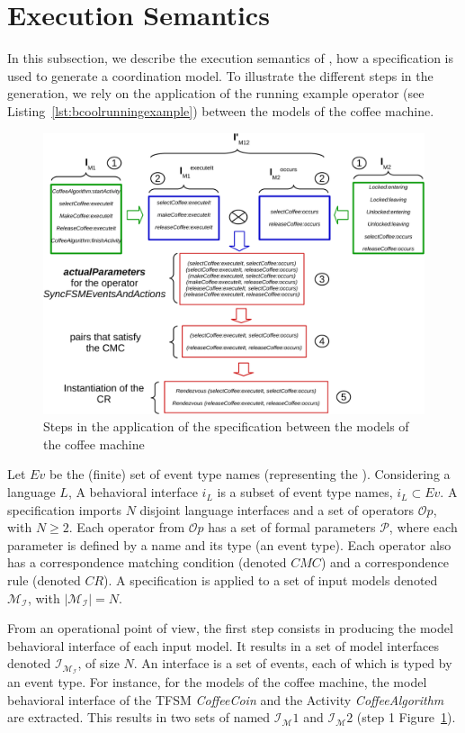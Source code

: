 \section{Execution Semantics}
In this subsection, we describe the execution semantics of \bcool, \ie how a \bcool specification is used to generate a coordination model. To illustrate the different steps in the generation, we rely on the application of the running example operator (see Listing~\ref{lst:bcoolrunningexample}) between the models of the coffee machine.

\begin{figure} [h]
	\center
	\includegraphics[width=.9\textwidth]{bcool/figs/semantics}
	\caption{Steps in the application of the \bcool specification between the models of the coffee machine}
	\label{fig:semantics}
\end{figure}

Let $Ev$ be the (finite) set of event type names (representing the \dse). Considering a language $L$, A behavioral interface $i_L$ is a subset of event type names, $i_L \subset Ev$. A \bcool specification imports $N$ disjoint language interfaces and a set of operators $\mathcal{O}p$, with $N\geq 2$. Each operator from $\mathcal{O}p$ has a set of formal parameters $\mathcal{P}$, where each parameter is defined by a name and its type (\ie an event type). Each operator also has a correspondence matching condition (denoted $CMC$) and a correspondence rule (denoted $CR$). A \bcool specification is applied to a set of input models denoted $\mathcal{M_I}$, with $|\mathcal{M_I}| = N$.

From an operational point of view, the first step consists in producing the model behavioral interface of each input model. It results in a set of model interfaces denoted $\mathcal{I_{M_I}}$, of size $N$. An interface is a set of events, each of which is typed by an event type. For instance, for the models of the coffee machine, the model behavioral interface of the TFSM \emph{CoffeeCoin} and the Activity \emph{CoffeeAlgorithm} are extracted. This results in two sets of \mse named  $\mathcal{I_M}{1}$ and $\mathcal{I_M}{2}$ (step 1 Figure~\ref{fig:semantics}).

